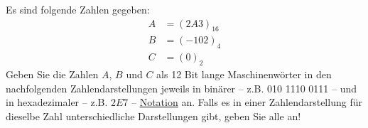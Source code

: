 \documentclass[a4paper, margins=3cm, newpage]{homework}
\begin{document}
\begin{problem}
Es sind folgende Zahlen gegeben:
\begin{align*}
	A &= (2A3)_{16} \\
	B &= (-102)_4 \\
	C &= (0)_2
\end{align*}
Geben Sie die Zahlen \(A\), \(B\) und \(C\) als 12 Bit lange Maschinenwörter in den nachfolgenden Zahlendarstellungen
jeweils in binärer – z.B. 010 1110 0111 – und in hexadezimaler – z.B. $2E7$ – \underline{Notation} an. Falls es in einer
Zahlendarstellung für dieselbe Zahl unterschiedliche Darstellungen gibt, geben Sie alle an!
\end{problem}
\end{document}
